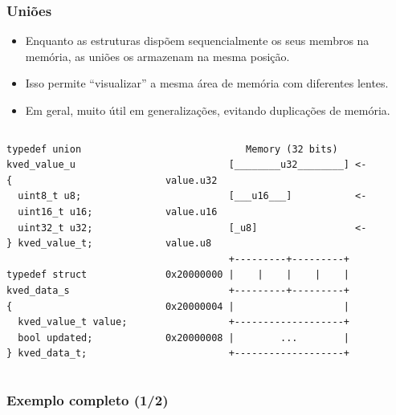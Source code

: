 \documentclass{beamer}
\begin{document}
\begin{frame}[fragile]
	\frametitle{Uniões}
	\begin{itemize}
	\item Enquanto as estruturas dispõem sequencialmente os seus membros na memória, as uniões os armazenam na mesma posição.
	\item Isso permite ``visualizar'' a mesma área de memória com diferentes lentes.
	\item Em geral, muito útil em generalizações, evitando duplicações de memória.
	\end{itemize}
	\begin{columns}[T] %
		\begin{column}{.5\textwidth}
	\begin{lstlisting}[style=customc]
typedef union kved_value_u
{
  uint8_t u8;
  uint16_t u16;
  uint32_t u32;
} kved_value_t;

typedef struct kved_data_s
{
  kved_value_t value;
  bool updated;
} kved_data_t;
	\end{lstlisting}
		\end{column}%
		\hfill%
		\begin{column}{.5\textwidth}
        {\tiny
	\begin{verbatim}
              Memory (32 bits)
           [________u32________] <- value.u32
           [___u16___]           <- value.u16
           [_u8]                 <- value.u8
           +---------+---------+
0x20000000 |    |    |    |    |
           +---------+---------+
0x20000004 |                   |
           +-------------------+
0x20000008 |        ...        |
           +-------------------+
	\end{verbatim}
    }
		\end{column}%
	\end{columns}
\end{frame}

\begin{frame}
	\frametitle{Exemplo completo (1/2)}
	\begin{columns}[T] %
		\begin{column}{.5\textwidth}
		
			\end{column}%
		\hfill%
		\begin{column}{.5\textwidth}
		
		\end{column}%
	\end{columns}
\end{frame}
\end{document}

